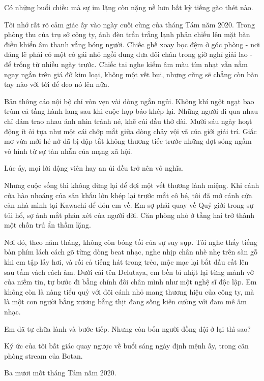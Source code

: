 \documentclass[../main.tex]{subfiles}
\begin{document}

Có những buổi chiều mà sự im lặng còn nặng nề hơn bất kỳ tiếng gào thét nào.

Tôi nhớ rất rõ cảm giác ấy vào ngày cuối cùng của tháng Tám năm 2020. Trong phòng thu của trụ sở công ty, ánh đèn trần trắng lạnh phản chiếu lên mặt bàn điều khiển âm thanh vắng bóng người. Chiếc ghế xoay bọc đệm ở góc phòng - nơi đáng lẽ phải có một cô gái nhỏ ngồi đung đưa đôi chân trong giờ nghỉ giải lao - để trống từ nhiều ngày trước. Chiếc tai nghe kiểm âm màu tím nhạt vẫn nằm ngay ngắn trên giá đỡ kim loại, không một vết bụi, nhưng cũng sẽ chẳng còn bàn tay nào với tới để đeo nó lên nữa.

Bản thông cáo nội bộ chỉ vỏn vẹn vài dòng ngắn ngủi. Không khí ngột ngạt bao trùm cả tầng hành lang sau khi cuộc họp báo khép lại. Những người đi qua nhau chỉ dám trao nhau ánh nhìn tránh né, khẽ cúi đầu thở dài. Mười sáu ngày hoạt động ít ỏi tựa như một cái chớp mắt giữa dòng chảy vội vã của giới giải trí. Giấc mơ vừa mới hé nở đã bị dập tắt không thương tiếc trước những đợt sóng ngầm vô hình từ sự tàn nhẫn của mạng xã hội.

Lúc ấy, mọi lời động viên hay an ủi đều trở nên vô nghĩa.

Nhưng cuộc sống thì không dừng lại để đợi một vết thương lành miệng. Khi cánh cửa hào nhoáng của sân khấu lớn khép lại trước mắt cô bé, tôi đã mở cánh cửa căn nhà mình tại Kawachi để đón em về. Em sợ phải quay về Quỷ giới trong sự tủi hổ, sợ ánh mắt phán xét của người đời. Căn phòng nhỏ ở tầng hai trở thành một chốn trú ẩn thầm lặng.

Nơi đó, theo năm tháng, không còn bóng tối của sự suy sụp. Tôi nghe thấy tiếng bàn phím lách cách gõ từng dòng beat nhạc, nghe nhịp chân nhè nhẹ trên sàn gỗ khi em tập lấy hơi, và rồi cả tiếng hát trong trẻo, mộc mạc lại bắt đầu cất lên sau tấm vách cách âm. Dưới cái tên Delutaya, em bền bỉ nhặt lại từng mảnh vỡ của niềm tin, tự bước đi bằng chính đôi chân mình như một nghệ sĩ độc lập. Em không còn là nàng tiểu quỷ với đôi cánh nhỏ mang thương hiệu của công ty, mà là một con người bằng xương bằng thịt đang sống kiên cường với đam mê âm nhạc.

Em đã tự chữa lành và bước tiếp. Nhưng còn bốn người đồng đội ở lại thì sao?

Ký ức của tôi bất giác quay ngược về buổi sáng ngày định mệnh ấy, trong căn phòng stream của Botan.

\ct

Ba mươi mốt tháng Tám năm 2020.
\end{document}

